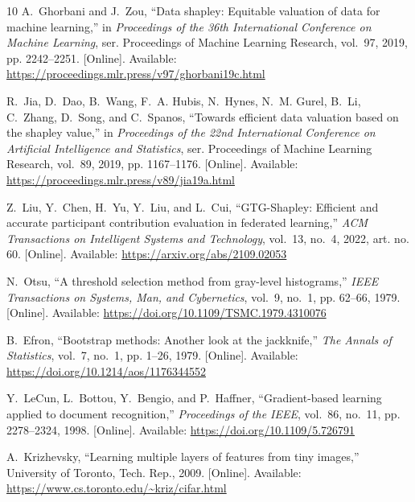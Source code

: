 \documentclass[journal]{IEEEtran}
\begin{document}
\begin{thebibliography}{10}
\BIBentryALTinterwordspacing
A.~Ghorbani and J.~Zou, ``Data shapley: Equitable valuation of data for machine
  learning,'' in \emph{Proceedings of the 36th International Conference on
  Machine Learning}, ser. Proceedings of Machine Learning Research, vol.~97,
  2019, pp. 2242--2251. [Online]. Available:
  \url{https://proceedings.mlr.press/v97/ghorbani19c.html}
\BIBentrySTDinterwordspacing

\BIBentryALTinterwordspacing
R.~Jia, D.~Dao, B.~Wang, F.~A. Hubis, N.~Hynes, N.~M. Gurel, B.~Li, C.~Zhang,
  D.~Song, and C.~Spanos, ``Towards efficient data valuation based on the
  shapley value,'' in \emph{Proceedings of the 22nd International Conference on
  Artificial Intelligence and Statistics}, ser. Proceedings of Machine Learning
  Research, vol.~89, 2019, pp. 1167--1176. [Online]. Available:
  \url{https://proceedings.mlr.press/v89/jia19a.html}
\BIBentrySTDinterwordspacing

\BIBentryALTinterwordspacing
Z.~Liu, Y.~Chen, H.~Yu, Y.~Liu, and L.~Cui, ``{GTG-Shapley}: Efficient and
  accurate participant contribution evaluation in federated learning,''
  \emph{ACM Transactions on Intelligent Systems and Technology}, vol.~13,
  no.~4, 2022, art. no. 60. [Online]. Available:
  \url{https://arxiv.org/abs/2109.02053}
\BIBentrySTDinterwordspacing

\BIBentryALTinterwordspacing
N.~Otsu, ``A threshold selection method from gray-level histograms,''
  \emph{IEEE Transactions on Systems, Man, and Cybernetics}, vol.~9, no.~1, pp.
  62--66, 1979. [Online]. Available:
  \url{https://doi.org/10.1109/TSMC.1979.4310076}
\BIBentrySTDinterwordspacing

\BIBentryALTinterwordspacing
B.~Efron, ``Bootstrap methods: Another look at the jackknife,'' \emph{The
  Annals of Statistics}, vol.~7, no.~1, pp. 1--26, 1979. [Online]. Available:
  \url{https://doi.org/10.1214/aos/1176344552}
\BIBentrySTDinterwordspacing

\BIBentryALTinterwordspacing
Y.~LeCun, L.~Bottou, Y.~Bengio, and P.~Haffner, ``Gradient-based learning
  applied to document recognition,'' \emph{Proceedings of the IEEE}, vol.~86,
  no.~11, pp. 2278--2324, 1998. [Online]. Available:
  \url{https://doi.org/10.1109/5.726791}
\BIBentrySTDinterwordspacing

\BIBentryALTinterwordspacing
A.~Krizhevsky, ``Learning multiple layers of features from tiny images,''
  University of Toronto, Tech. Rep., 2009. [Online]. Available:
  \url{https://www.cs.toronto.edu/~kriz/cifar.html}
\BIBentrySTDinterwordspacing


\end{thebibliography}
\end{document}
